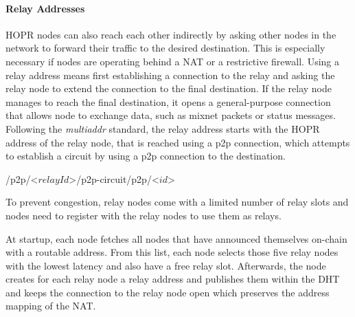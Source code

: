 \paragraph{Relay Addresses}

HOPR nodes can also reach each other indirectly by asking other nodes in the network to forward their traffic to the desired destination. This is especially necessary if nodes are operating behind a NAT or a restrictive firewall. Using a relay address means first establishing a connection to the relay and asking the relay node to extend the connection to the final destination. If the relay node manages to reach the final destination, it opens a general-purpose connection that allows node to exchange data, such as mixnet packets or status messages. Following the \textit{multiaddr} standard, the relay address starts with the HOPR address of the relay node, that is reached using a p2p connection, which attempts to establish a circuit by using a p2p connection to the destination.

\begin{center}
    \textsf{/p2p/}\textless\textsf{$relayId$}\textgreater\textsf{/p2p-circuit/p2p/}\textless{}\textsf{$id$}\textgreater{}
\end{center}

To prevent congestion, relay nodes come with a limited number of relay slots and nodes need to register with the relay nodes to use them as relays.

At startup, each node fetches all nodes that have announced themselves on-chain with a routable address. From this list, each node selects those five relay nodes with the lowest latency and also have a free relay slot. Afterwards, the node creates for each relay node a relay address and publishes them within the DHT and keeps the connection to the relay node open which preserves the address mapping of the NAT.
